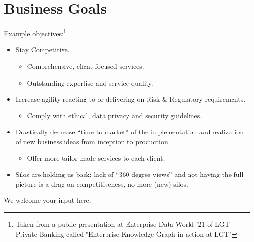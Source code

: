 \section{Business Goals}%
\label{sec:ekg-mm-a-1-2}
\label{sec:ekg-mm-business-goals}



Example objectives:\footnote{Taken from a public presentation at Enterprise Data World '21 of LGT Private Banking
called "Enterprise Knowledge Graph in action at LGT"}

\begin{itemize}
    \item Stay Competitive.
          \begin{itemize}
              \item Comprehensive, client-focused services.
              \item Outstanding expertise and service quality.
          \end{itemize}
    \item Increase agility reacting to or delivering on Risk \& Regulatory requirements.
          \begin{itemize}
              \item Comply with ethical, data privacy and security guidelines.
          \end{itemize}
    \item Drastically decrease \enquote{time to market} of the implementation and realization of new business ideas from
          inception to production.
          \begin{itemize}
              \item Offer more tailor-made services to each client.
          \end{itemize}
    \item Silos are holding us back: lack of \enquote{360 degree views} and not having the full picture is a
          drag on competitiveness, no more (new) silos.
\end{itemize}

\ekgmmContextSection

We welcome your input here.
